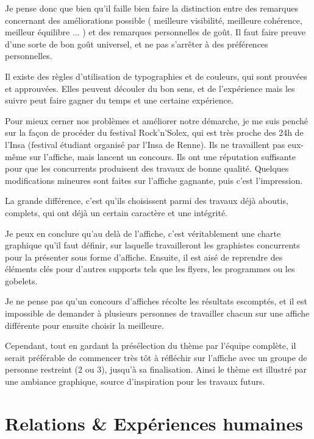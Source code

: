         Je pense donc que bien qu'il faille bien faire la distinction entre des remarques concernant des améliorations possible ( meilleure visibilité, meilleure cohérence, meilleur équilibre ... ) et des remarques personnelles de goût.
        Il faut faire preuve d'une sorte de bon goût universel, et ne pas s'arrêter à des préférences personnelles.
        
        Il existe des règles d'utilisation de typographies et de couleurs, qui sont prouvées  et approuvées. Elles peuvent découler du bon sens, et de l'expérience mais les suivre peut faire gagner du temps et une certaine expérience.

        
        Pour mieux cerner nos problèmes et améliorer notre démarche, je me suis penché sur la façon de procéder du festival Rock'n'Solex, qui est très proche des 24h de l'Insa (festival étudiant organisé par l'Insa de Renne).
        Ils ne travaillent pas eux-même sur l'affiche, mais lancent un concours. Ils ont une réputation suffisante pour que les concurrents produisent des travaux de bonne qualité.
        Quelques modifications mineures sont faites sur l'affiche gagnante, puis c'est l'impression.
        
        La grande différence, c'est qu'ils choisissent parmi des travaux déjà aboutis, complets, qui ont déjà un certain caractère et une intégrité. 
        
        Je peux en conclure qu'au delà de l'affiche, c'est véritablement une charte graphique qu'il faut définir, sur laquelle travailleront les graphistes concurrents pour la présenter sous forme d'affiche. Ensuite, il est aisé de reprendre des éléments clés pour d'autres supports tels que les flyers, les programmes ou les gobelets.
        
        Je ne pense pas qu'un concours d'affiches récolte les résultats escomptés, et il est impossible de demander à plusieurs personnes de travailler chacun sur une affiche différente pour ensuite choisir la meilleure.

        Cependant, tout en gardant la présélection du thème par l'équipe complète, il serait préférable de commencer très tôt à réfléchir sur l'affiche avec un groupe de personne restreint (2 ou 3), jusqu'à sa finalisation. Ainsi le thème est illustré par une ambiance graphique, source d'inspiration pour les travaux futurs.
        

\section{Relations \& Expériences humaines}


